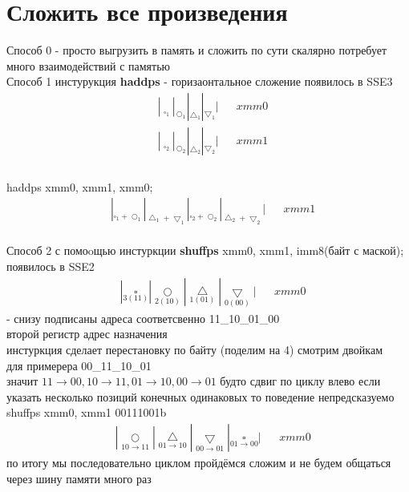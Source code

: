 \documentclass[a4paper, 12pt]{article}
\begin{document}
    \section*{Сложить все произведения}
    Способ 0 - просто выгрузить в память и сложить по сути скалярно потребует много взаимодействий с памятью \\
    
    Способ 1 инстурукция \textbf{haddps} - горизаонтальное сложение появилось в SSE3
    \begin{align*}
        &|\underset{\square_1}{\quad}|\underset{\bigcirc_1}{\quad}|\underset{\bigtriangleup_1}{\quad}|\underset{\bigtriangledown_1}{\quad}| && xmm0 \\
        &|\underset{\square_2}{\quad}|\underset{\bigcirc_2}{\quad}|\underset{\bigtriangleup_2}{\quad}|\underset{\bigtriangledown_2}{\quad}| && xmm1 \\
    \end{align*} \\
    haddps xmm0, xmm1, xmm0;
    \begin{align*}
        &|\underset{\square_1+\bigcirc_1}{\quad}|\underset{\bigtriangleup_1+\bigtriangledown_1}{\quad}|\underset{\square_2+\bigcirc_2}{\quad}|\underset{\bigtriangleup_2+\bigtriangledown_2}{\quad}| && xmm1 \\
    \end{align*}
    
    Способ 2 с помоoщью инстуркции \textbf{shuffps} xmm0, xmm1, imm8(байт с маской); появилось в SSE2
    \begin{align*}
        &|\underset{3(11)}{\square}|\underset{2(10)}{\bigcirc}|\underset{1(01)}{\bigtriangleup}|\underset{0(00)}{\bigtriangledown}| && xmm0
    \end{align*}
    - снизу подписаны адреса соответсвенно 11\_10\_01\_00 \\
    второй регистр адрес назначения \\
    инстуркция сделает перестановку по байту (поделим на 4) смотрим двойкам \\
    для примерера 00\_11\_10\_01 \\
    значит $11\rightarrow00,10\rightarrow11,01\rightarrow10,00\rightarrow01$ будто сдвиг по циклу влево если указать несколько позиций конечных одинаковых то поведение непредсказуемо
    shuffps xmm0, xmm1 00111001b
    \begin{align*}
        &|\underset{10\rightarrow11}{\bigcirc}|\underset{01\rightarrow10}{\bigtriangleup}|\underset{00\rightarrow01}{\bigtriangledown}|\underset{01\rightarrow00}{\square}| && xmm0
    \end{align*}
    по итогу мы последовательно циклом пройдёмся сложим и не будем общаться через шину памяти много раз
\end{document}
